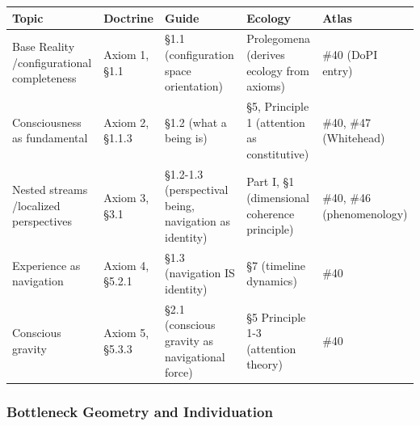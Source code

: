 {\small
\begin{longtable}{>{\raggedright\arraybackslash}p{} >{\raggedright\arraybackslash}p{} >{\raggedright\arraybackslash}p{} >{\raggedright\arraybackslash}p{} >{\raggedright\arraybackslash}p{}}
\toprule
\textbf{Topic} & \textbf{Doctrine} & \textbf{Guide} & \textbf{Ecology} & \textbf{Atlas} \\
\midrule
\endhead
Base Reality /\allowbreak  configurational completeness & Axiom 1, §1.1 & §1.1 (configuration space orientation) & Prolegomena (derives ecology from axioms) & \#40 (DoPI entry) \\
Consciousness as fundamental & Axiom 2, §1.1.3 & §1.2 (what a being is) & §5, Principle 1 (attention as constitutive) & \#40, \#47 (Whitehead) \\
Nested streams /\allowbreak  localized perspectives & Axiom 3, §3.1 & §1.2-1.3 (perspectival being, navigation as identity) & Part I, §1 (dimensional coherence principle) & \#40, \#46 (phenomenology) \\
Experience as navigation & Axiom 4, §5.2.1 & §1.3 (navigation IS identity) & §7 (timeline dynamics) & \#40 \\
Conscious gravity & Axiom 5, §5.3.3 & §2.1 (conscious gravity as navigational force) & §5 Principle 1-3 (attention theory) & \#40 \\
\bottomrule
\end{longtable}
}



\subsubsection*{Bottleneck Geometry and Individuation}



